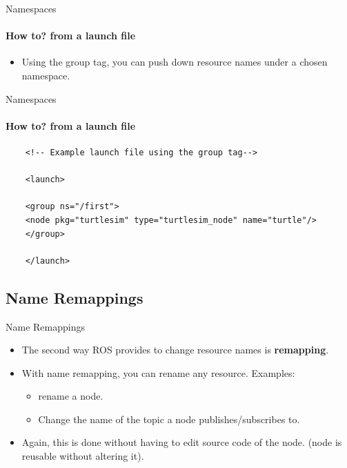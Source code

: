 \documentclass{beamer}
\begin{document}
\begin{frame}[fragile]{Namespaces}
    \framesubtitle{How to? from a launch file}
    \begin{itemize}     
        \item Using the  {\ttfamily \colorbox{gray!30!white}{group}} tag, you can push down resource names under a chosen namespace.
    \end{itemize}  
\end{frame}



\begin{frame}[fragile]{Namespaces}
    \framesubtitle{How to? from a launch file}
    \begin{lstlisting}
    <!-- Example launch file using the group tag-->
    
    <launch>
    
    <group ns="/first">
    <node pkg="turtlesim" type="turtlesim_node" name="turtle"/>
    </group>
    
    </launch>
    \end{lstlisting}
\end{frame}


\subsection{Name Remappings}
\begin{frame}{Name Remappings}
    \begin{itemize}

        \item The second way ROS provides to change resource names is \textbf{remapping}.
        
        \item With name remapping, you can rename any resource. Examples:
        \begin{itemize}
            \item rename a node.
            \item Change the name of the topic a node publishes/subscribes to.
        \end{itemize}
        \item Again, this is done without having to edit source code of the node. (node is reusable without altering it).
    \end{itemize}  
\end{frame}
\end{document}
